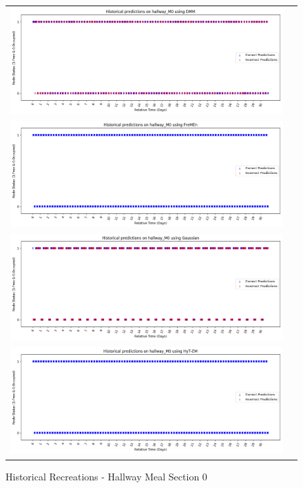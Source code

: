 \begin{figure}[!Hp]
  \begin{tabular}{cc}
    {\includegraphics[width = 6in]{images/results/Historical_hallway_M0_DMM.png}} \\
    {\includegraphics[width = 6in]{images/results/Historical_hallway_M0_FreMEn.png}} \\
    {\includegraphics[width = 6in]{images/results/Historical_hallway_M0_Gaussian.png}} \\
    {\includegraphics[width = 6in]{images/results/Historical_hallway_M0_HyT-EM.png}} \\
  \end{tabular}
  \caption{Historical Recreations - Hallway Meal Section 0}
\end{figure}

